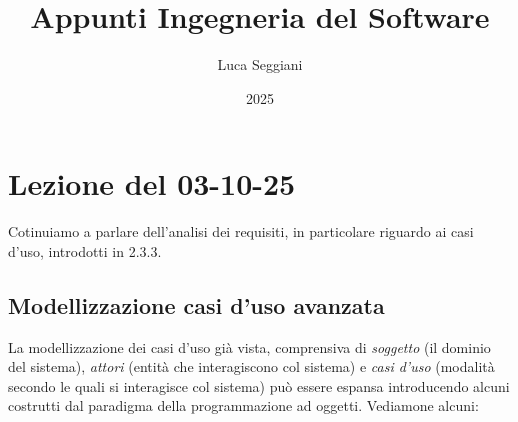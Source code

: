\documentclass[a4paper,11pt]{article}
\title{Appunti Ingegneria del Software}
\author{Luca Seggiani}
\date{2025}
\begin{document}
\section{Lezione del 03-10-25}

\thispagestyle{empty}
\pagestyle{fancy}

Cotinuiamo a parlare dell'analisi dei requisiti, in particolare riguardo ai casi d'uso, introdotti in 2.3.3.

\subsection{Modellizzazione casi d'uso avanzata}
La modellizzazione dei casi d'uso già vista, comprensiva di \textit{soggetto} (il dominio del sistema), \textit{attori} (entità che interagiscono col sistema) e \textit{casi d'uso} (modalità secondo le quali si interagisce col sistema) può essere espansa introducendo alcuni costrutti dal paradigma della programmazione ad oggetti. Vediamone alcuni:
\end{document}
